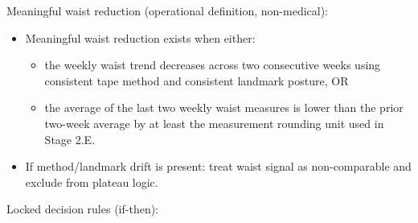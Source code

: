 \documentclass[10pt]{article}
\begin{document}
Meaningful waist reduction (operational definition, non-medical):

\begin{itemize}
\item Meaningful waist reduction exists when either:
\begin{itemize}
\item the weekly waist trend decreases across two consecutive weeks using consistent tape method and consistent landmark posture, OR
\item the average of the last two weekly waist measures is lower than the prior two-week average by at least the measurement rounding unit used in Stage 2.E.
\end{itemize}
\item If method/landmark drift is present: treat waist signal as non-comparable and exclude from plateau logic.
\end{itemize}

Locked decision rules (if-then):
\end{document}
